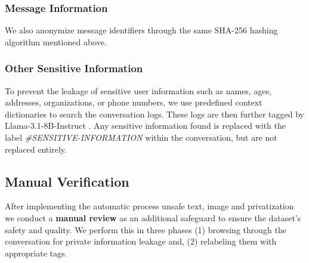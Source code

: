 \subsubsection{Message Information}
We also anonymize message identifiers through the same SHA-256 hashing algorithm mentioned above.

\subsubsection{Other Sensitive Information}
To prevent the leakage of sensitive user information such as names, ages, addresses, organizations, or phone numbers, we use predefined context dictionaries to search the conversation logs. These logs are then further tagged by Llama-3.1-8B-Instruct \cite{llama}. Any sensitive information found is replaced with the label \textit{\#SENSITIVE-INFORMATION} within the conversation, but are not replaced entirely.




    
    

\subsection{Manual Verification}
After implementing the automatic process unsafe text, image and privatization we conduct a \textbf{manual review} as an additional safeguard to ensure the dataset’s safety and quality. We perform this in three phases (1) browsing through the conversation for private information leakage and, (2) relabeling them with appropriate tags.


